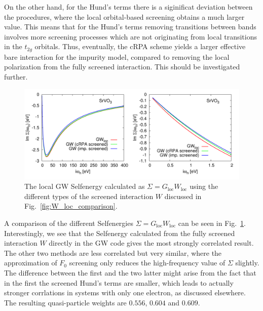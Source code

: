 \documentclass[12pt,a4paper]{scrartcl}
\numberwithin{equation}{section}
\begin{document}
On the other hand, for the Hund's terms there is a siginificat deviation between the procedures,
where the local orbital-based screening obtains a much larger value.
This means that for the Hund's terms removing transitions between bands involves more
screening processes which are not originating from local transitions in the $t_{2g}$ orbitals.
Thus, eventually, the cRPA scheme yields a larger effective bare interaction 
for the impurity model, compared to removing the local polarization from the fully screened interaction.
This should be investigated further.

\begin{figure}[t]
\includegraphics[width=1.0\textwidth]{figs/Wloc/Sigma_comp.pdf}
\caption{The local GW Selfenergy calculated as $\Sigma=G_{\mathrm{loc}}W_{\mathrm{loc}}$
using the different types of the screened interaction $W$ discussed
in Fig.~\ref{fig:W_loc_comparison}.
}
\label{fig:Sigma_GW_comparison}
\end{figure}

A comparison of the different Selfenergies $\Sigma=G_{\mathrm{loc}}W_{\mathrm{loc}}$
can be seen in Fig.~\ref{fig:Sigma_GW_comparison}.
Interestingly, we see that the Selfenergy calculated from the fully screened interaction 
$W$ directly in the GW code gives the most strongly correlated result.
The other two methods are less correlated but very similar, where
the approximation of $F_0$ screening only reduces the high-frequency value 
of $\Sigma$ slightly.
The difference between the first and the two latter might arise from
the fact that in the first the screened Hund's terms are smaller, which
leads to actually stronger corrlations in systems with only one
electron, as discussed elsewhere.
The resulting quasi-particle weights are $0.556$, $0.604$ and $0.609$.

\end{document}
